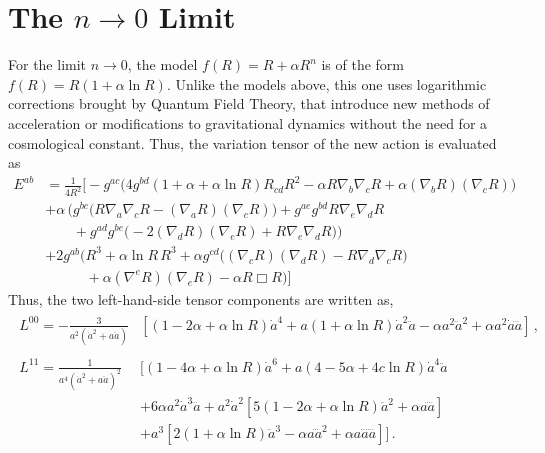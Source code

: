 \documentclass{book}
\begin{document}
	\section{The $n\to0$ Limit}
	For the limit $n\to0$, the model $f(R)=R+\alpha R^n$ is of the form $f(R)=R(1+\alpha\ln R)$. Unlike the models above, this one uses logarithmic corrections brought by Quantum Field Theory, that introduce new methods of acceleration or modifications to gravitational dynamics without the need for a cosmological constant. 
	Thus, the variation tensor of the new action is evaluated as
	\begin{equation}
		\label{log_R_model_Var}
		\begin{aligned} E^{ab} &= \frac{1}{4 R^2} \Big[ - g^{ac} \Big( 4 g^{bd} (1 + \alpha + \alpha \ln R) R_{cd} R^2 -\alpha R \nabla_b \nabla_c R + \alpha (\nabla_b R)(\nabla_c R) \Big) \\ &+ \alpha \, \Big( g^{bc} \big( R \nabla_a \nabla_c R - (\nabla_a R)(\nabla_c R) \big) + g^{ae} g^{bd} R \nabla_e \nabla_d R \\ &\phantom{+ \alpha \, \Big( } + g^{ad} g^{be} \big( -2 (\nabla_d R)(\nabla_e R) + R \nabla_e \nabla_d R \big) \Big) \\ &+ 2 g^{ab} \Big( R^3 + \alpha \ln R \, R^3 + \alpha g^{cd} \big( (\nabla_c R)(\nabla_d R) - R \nabla_d \nabla_c R \big) \\ &\phantom{+ 2 g^{ab} \Big( } +\alpha(\nabla^e R)(\nabla_e R) -\alpha R \Box R \Big) \Big] \end{aligned}
	\end{equation}
	Thus, the two left-hand-side tensor components are written as,
	\begin{equation}
			\begin{matrix}
				\begin{aligned}
					L^{00}=-\frac{3 }{a^2 \left(\dot{a}^2 + a\ddot{a}\right)} &  \left[ \left(1 - 2\alpha + \alpha \ln R\right)\dot{a}^4 + a \left(1 + \alpha \ln R\right)\dot{a}^2\ddot{a} - \alpha a^2 \ddot{a}^2 + \alpha a^2 \dot{a} \dddot{a} \right] \, , \\ \, & \, \\
				
					L^{11} =\frac{1}{a^4 \left(\dot{a}^2 + a\ddot{a}\right)^2}& \Big[ \left(1 - 4\alpha + \alpha \ln R\right)\dot{a}^6 + a \left(4 - 5\alpha + 4c \ln R\right)\dot{a}^4\ddot{a} \\  \, & + 6\alpha a^2 \dot{a}^3 \dddot{a} + a^2 \dot{a}^2 \left[ 5\left(1 - 2\alpha + \alpha \ln R\right)\ddot{a}^2 + \alpha a \ddddot{a} \right]   \\ \, & + a^3 \left[ 2\left(1 + \alpha \ln R\right)\ddot{a}^3 - \alpha a \dddot{a}^2 + \alpha a \ddot{a} \ddddot{a} \right] \Big] \, .
				\end{aligned}
			\end{matrix}
	\end{equation}
\end{document}
